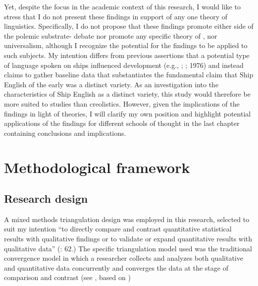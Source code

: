 Yet, despite the  focus in the academic context of this research, I would like to stress that I do not present these findings in support of any one theory of  linguistics. Specifically, I do not propose that these findings promote either side of the polemic substrate- debate nor promote any specific theory of ,  nor universalism, although I recognize the potential for the findings to be applied to such subjects. My intention differs from previous assertions that a potential type of language spoken on ships influenced  development (e.g., \citealt{Reinecke1938}; \citealt{Hancock1972}; 1976) and instead claims to gather baseline data that substantiates the fundamental claim that Ship English of the early  was a distinct variety. As an investigation into the characteristics of Ship English as a distinct variety, this study would therefore be more suited to  studies than creolistics. However, given the implications of the findings in light of  theories, I will clarify my own position and highlight potential applications of the findings for different schools of thought in the last chapter containing conclusions and implications. 



\section{{Methodological framework}}\label{sec:1.3}



\subsection{{Research design}}\label{sec:1.3.1}



A mixed methods triangulation design was employed in this research, selected to suit my intention “to directly compare and contrast quantitative statistical results with qualitative findings or to validate or expand quantitative results with qualitative data” (\citealt{CreswellPlanoClark2007}: 62.) The specific triangulation model used was the traditional convergence model in which a researcher collects and analyzes both qualitative and quantitative data concurrently and converges the data at the stage of comparison and contrast (see , based on \citealt{CreswellPlanoClark2007})


